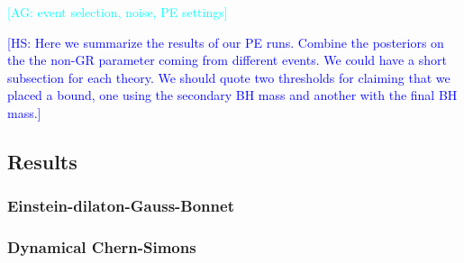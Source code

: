 \documentclass[twocolumn,prd,aps,superscriptaddress,preprintnumbers,tightenlines,showpacs,nofootinbib,eqsecnum,amsfonts,amsmath,longbibliography]{revtex4-1}
\newcommand{\pSEOB}{\texttt{pSEOBNR}}
\newcommand{\ag}[1]{{\textcolor{cyan}{{[AG: #1]}} }}
\newcommand{\hs}[1]{{\textcolor{blue}{{[HS: #1]}} }}
\begin{document}

%




\ag{event selection, noise, PE settings}


\hs{Here we summarize the results of our PE runs. Combine the posteriors on the
the non-GR parameter coming from different events. We could have a short
subsection for each theory. We should quote two thresholds for claiming
that we placed a bound, one using the secondary BH mass and another with
the final BH mass.}

\subsection{Results}

\subsubsection{Einstein-dilaton-Gauss-Bonnet}
\label{sec:results_edgb}

\subsubsection{Dynamical Chern-Simons}
\label{sec:results_dcs}
\end{document}
